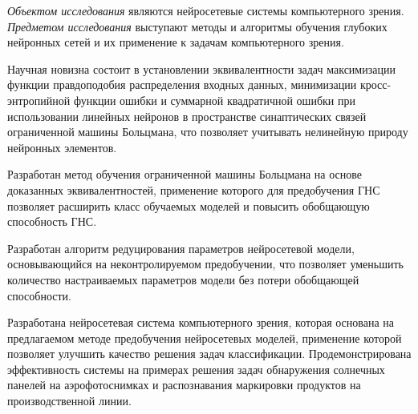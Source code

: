 \textit{Объектом исследования} являются нейросетевые системы компьютерного зрения. \textit{Предметом исследования} выступают методы и алгоритмы обучения глубоких нейронных сетей и их применение к задачам компьютерного зрения.

\vspace{3mm}
\novelty
\vspace{3mm}

Научная новизна состоит в установлении эквивалентности задач максимизации функции правдоподобия распределения входных данных, минимизации кросс-энтропийной функции ошибки и суммарной квадратичной ошибки при использовании линейных нейронов в пространстве синаптических связей ограниченной машины Больцмана, что позволяет учитывать нелинейную природу нейронных элементов.

Разработан метод обучения ограниченной машины Больцмана на основе доказанных эквивалентностей, применение которого для предобучения ГНС позволяет расширить класс обучаемых моделей и повысить обобщающую способность ГНС.

Разработан алгоритм редуцирования параметров нейросетевой модели, основывающийся на неконтролируемом предобучении, что позволяет уменьшить количество настраиваемых параметров модели без потери обобщающей способности.

Разработана нейросетевая система компьютерного зрения, которая основана на предлагаемом методе предобучения нейросетевых моделей, применение которой позволяет улучшить качество решения задач классификации. Продемонстрирована эффективность системы на примерах решения задач обнаружения солнечных панелей на аэрофотоснимках и распознавания маркировки продуктов на производственной линии.

\vspace{10mm}
\vspace{3mm}

